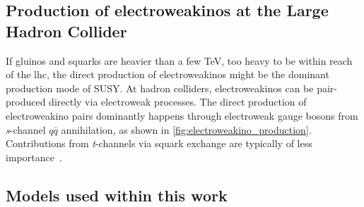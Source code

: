 \subsection{Production of electroweakinos at the Large Hadron Collider}

If gluinos and squarks are heavier than a few TeV, \ie too heavy to be within reach of the \gls{lhc}, the direct production of electroweakinos might be the dominant production mode of SUSY. At hadron colliders, electroweakinos can be pair-produced directly via electroweak processes. The direct production of electroweakino pairs dominantly happens through electroweak gauge bosons from \textit{s}-channel $q\bar{q}$ annihilation, as shown in \cref{fig:electroweakino_production}. Contributions from \textit{t}-channels via squark exchange are typically of less importance~\cite{Martin:1997ns}.


\subsection{Models used within this work}\label{sec:models_used}


